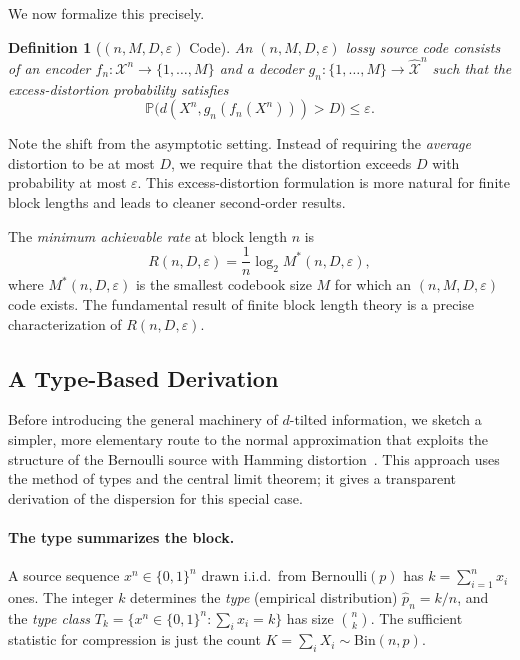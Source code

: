 \documentclass[11pt]{article}
\newtheorem{definition}{Definition}[section]
\newcommand{\Ber}{\mathrm{Bernoulli}}
\newcommand{\Prob}{\mathbb{P}}
\newcommand{\calX}{\mathcal{X}}
\newcommand{\calXhat}{\hat{\mathcal{X}}}
\begin{document}
We now formalize this precisely.

\begin{definition}[$(n, M, D, \varepsilon)$ Code]
An $(n, M, D, \varepsilon)$ lossy source code consists of an encoder
$f_n : \calX^n \to \{1, \ldots, M\}$ and a decoder
$g_n : \{1, \ldots, M\} \to \calXhat^n$ such that the
\emph{excess-distortion probability} satisfies
\begin{equation}
\label{eq:excess_distortion}
\Prob\bigl(d(X^n, g_n(f_n(X^n))) > D\bigr) \leq \varepsilon.
\end{equation}
\end{definition}

Note the shift from the asymptotic setting.
Instead of requiring the \emph{average} distortion to be at most $D$, we
require that the distortion exceeds $D$ with probability at most $\varepsilon$.
This excess-distortion formulation is more natural for finite block lengths and
leads to cleaner second-order results.

The \emph{minimum achievable rate} at block length $n$ is
\begin{equation}
\label{eq:Rn}
R(n, D, \varepsilon) = \frac{1}{n} \log_2 M^*(n, D, \varepsilon),
\end{equation}
where $M^*(n, D, \varepsilon)$ is the smallest codebook size $M$ for which an
$(n, M, D, \varepsilon)$ code exists.
The fundamental result of finite block length theory is a precise
characterization of $R(n, D, \varepsilon)$.

\subsection{A Type-Based Derivation}
\label{subsec:type_derivation}

Before introducing the general machinery of $d$-tilted information, we sketch
a simpler, more elementary route to the normal approximation that exploits the
structure of the Bernoulli source with Hamming
distortion~\cite{ingber2011}.
This approach uses the method of types and the central limit theorem;
it gives a transparent derivation of the dispersion for this special case.

\paragraph{The type summarizes the block.}
A source sequence $x^n \in \{0,1\}^n$ drawn i.i.d.\ from $\Ber(p)$ has
$k = \sum_{i=1}^{n} x_i$ ones.
The integer $k$ determines the \emph{type} (empirical distribution)
$\hat{p}_n = k/n$, and the \emph{type class}
$T_k = \{x^n \in \{0,1\}^n : \sum_i x_i = k\}$ has size $\binom{n}{k}$.
The sufficient statistic for compression is just the count
$K = \sum_i X_i \sim \mathrm{Bin}(n, p)$.
\end{document}
